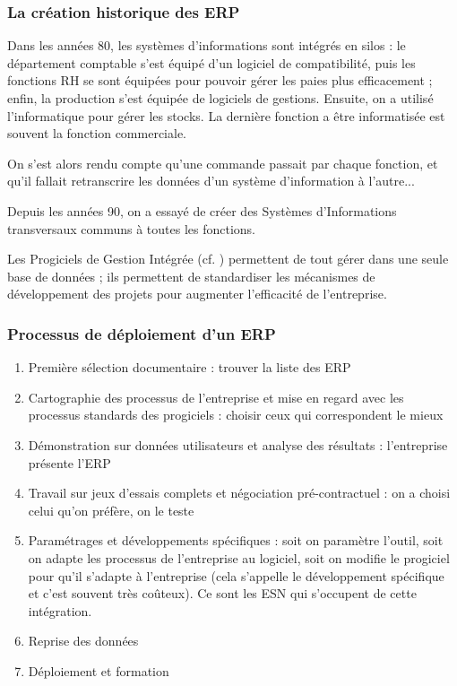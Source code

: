 \documentclass[10pt,a4paper,french]{article}
\begin{document}
\subsubsection{La création historique des ERP}

Dans les années 80, les systèmes d'informations sont intégrés en silos : le département comptable s'est équipé d'un logiciel de compatibilité, puis les fonctions RH se sont équipées pour pouvoir gérer les paies plus efficacement ; enfin, la production s'est équipée de logiciels de gestions. Ensuite, on a utilisé l'informatique pour gérer les stocks. La dernière fonction a être informatisée est souvent la fonction commerciale.

On s'est alors rendu compte qu'une commande passait par chaque fonction, et qu'il fallait retranscrire les données d'un système d'information à l'autre...

Depuis les années 90, on a essayé de créer des Systèmes d'Informations transversaux communs à toutes les fonctions.

Les Progiciels de Gestion Intégrée (cf. ) permettent de tout gérer dans une seule base de données ; ils permettent de standardiser les mécanismes de développement des projets pour augmenter l'efficacité de l'entreprise.

\subsubsection{Processus de déploiement d'un ERP}

\begin{enumerate}
\item Première sélection documentaire : trouver la liste des ERP
\item Cartographie des processus de l'entreprise et mise en regard avec les processus standards des progiciels : choisir ceux qui correspondent le mieux
\item Démonstration sur données utilisateurs et analyse des résultats : l'entreprise présente l'ERP
\item Travail sur jeux d'essais complets et négociation pré-contractuel : on a choisi celui qu'on préfère, on le teste
\item Paramétrages et développements spécifiques : soit on paramètre l'outil, soit on adapte les processus de l'entreprise au logiciel, soit on modifie le progiciel pour qu'il s'adapte à l'entreprise (cela s'appelle le développement spécifique et c'est souvent très coûteux). Ce sont les ESN qui s'occupent de cette intégration.
\item Reprise des données
\item Déploiement et formation
\end{enumerate}
\end{document}
